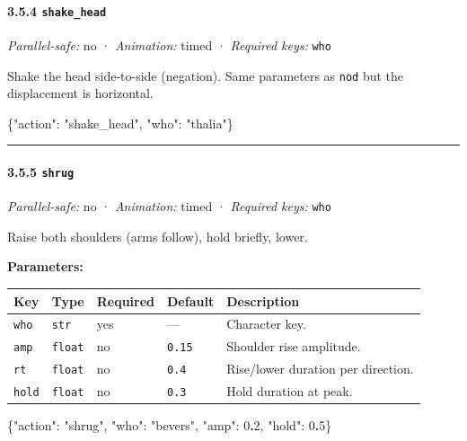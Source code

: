 \documentclass[
  12pt,
  letterpaper,
]{book}
\newenvironment{Shaded}{}{}
\newcommand{\DataTypeTok}[1]{\textcolor[rgb]{0.56,0.13,0.00}{#1}}
\newcommand{\DecValTok}[1]{\textcolor[rgb]{0.25,0.63,0.44}{#1}}
\newcommand{\ErrorTok}[1]{\textcolor[rgb]{1.00,0.00,0.00}{\textbf{#1}}}
\newcommand{\FunctionTok}[1]{\textcolor[rgb]{0.02,0.16,0.49}{#1}}
\newcommand{\StringTok}[1]{\textcolor[rgb]{0.25,0.44,0.63}{#1}}
\begin{document}
\paragraph{\texorpdfstring{3.5.4
\texttt{shake\_head}}{3.5.4 shake\_head}}\label{shake_head}

\emph{Parallel-safe:} no · \emph{Animation:} timed · \emph{Required
keys:} \texttt{who}

Shake the head side-to-side (negation). Same parameters as \texttt{nod}
but the displacement is horizontal.

\begin{Shaded}
\begin{Highlighting}[]
\FunctionTok{\{}\DataTypeTok{"action"}\FunctionTok{:} \StringTok{"shake\_head"}\FunctionTok{,} \DataTypeTok{"who"}\FunctionTok{:} \StringTok{"thalia"}\FunctionTok{\}}
\end{Highlighting}
\end{Shaded}

\begin{center}\rule{0.5\linewidth}{0.5pt}\end{center}

\paragraph{\texorpdfstring{3.5.5
\texttt{shrug}}{3.5.5 shrug}}\label{shrug}

\emph{Parallel-safe:} no · \emph{Animation:} timed · \emph{Required
keys:} \texttt{who}

Raise both shoulders (arms follow), hold briefly, lower.

\textbf{Parameters:}

\begin{longtable}[]{@{}lllll@{}}
\toprule\noalign{}
Key & Type & Required & Default & Description \\
\midrule\noalign{}
\endhead
\bottomrule\noalign{}
\endlastfoot
\texttt{who} & \texttt{str} & yes & --- & Character key. \\
\texttt{amp} & \texttt{float} & no & \texttt{0.15} & Shoulder rise
amplitude. \\
\texttt{rt} & \texttt{float} & no & \texttt{0.4} & Rise/lower duration
per direction. \\
\texttt{hold} & \texttt{float} & no & \texttt{0.3} & Hold duration at
peak. \\
\end{longtable}

\begin{Shaded}
\begin{Highlighting}[]
\FunctionTok{\{}\DataTypeTok{"action"}\FunctionTok{:} \StringTok{"shrug"}\FunctionTok{,} \DataTypeTok{"who"}\FunctionTok{:} \StringTok{"bevers"}\FunctionTok{,} \DataTypeTok{"amp"}\FunctionTok{:} \DecValTok{0}\ErrorTok{.}\DecValTok{2}\FunctionTok{,} \DataTypeTok{"hold"}\FunctionTok{:} \DecValTok{0}\ErrorTok{.}\DecValTok{5}\FunctionTok{\}}
\end{Highlighting}
\end{Shaded}
\end{document}
